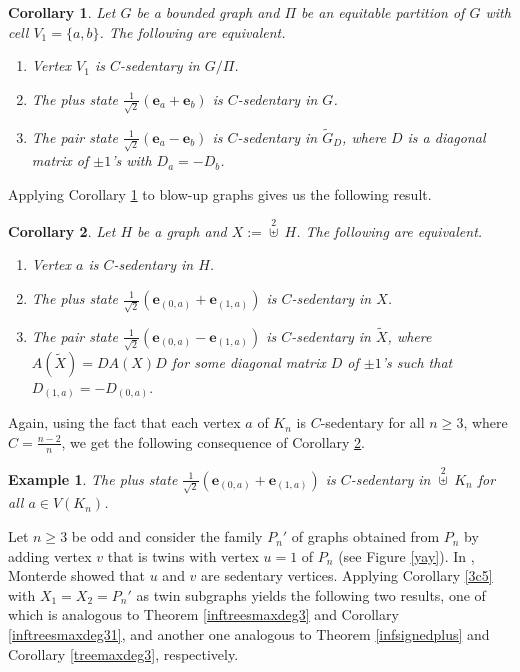 \documentclass[12pt,a4paper]{article}
\newtheorem{cor}{Corollary}
\newtheorem{exa}{Example}
\def \e {{\bf e}}
\def \e {{\mathbf e}}
\begin{document}
\begin{cor}
\label{plusPi2}
Let $G$ be a bounded graph and $\Pi$ be an equitable partition of $G$ with cell $V_1=\{a,b\}$. 
The following are equivalent.
\begin{enumerate}
\item Vertex $V_1$ is $C$-sedentary in $G/\Pi$.
\item The plus state $\frac{1}{\sqrt2}(\e_a+\e_{b})$ is $C$-sedentary in $G$.
\item The pair state $\frac{1}{\sqrt2}(\e_a-\e_{b})$ is $C$-sedentary in $\tilde{G}_D$, where $D$ is a diagonal matrix of $\pm 1$'s with $D_{a}=-D_{b}$.
\end{enumerate}
\end{cor}

Applying Corollary \ref{plusPi2} to blow-up graphs gives us the following result.

\begin{cor}
\label{sedbu}
Let $H$ be a graph and $X:=\overset{2}{\uplus}~H$. The following are equivalent.
\begin{enumerate}
\item Vertex $a$ is $C$-sedentary in $H$.
\item The plus state $\frac{1}{\sqrt2}(\e_{(0,a)}+\e_{(1,a)})$ is $C$-sedentary in $X$.
\item The pair state $\frac{1}{\sqrt2}(\e_{(0,a)}-\e_{(1,a)})$ is $C$-sedentary in $\tilde{X}$, where $A(\tilde{X})=DA(X)D$ for some diagonal matrix $D$ of $\pm 1$'s such that $D_{(1,a)}=-D_{(0,a)}.$
\end{enumerate}
\end{cor}

Again, using the fact that each vertex $a$ of $K_n$ is $C$-sedentary for all $n\geq 3$, where $C=\frac{n-2}{n}$, we get the following consequence of Corollary \ref{sedbu}.

\begin{exa}
The plus state $\frac{1}{\sqrt2}(\e_{(0,a)}+\e_{(1,a)})$ is $C$-sedentary in $\overset{2}{\uplus}~K_n$ for all $a\in V(K_n)$.
\end{exa}

Let $n\geq 3$ be odd and consider the family $P_n'$ of graphs obtained from $P_n$ by adding vertex $v$ that is twins with vertex $u=1$ of $P_n$ (see Figure \ref{yay}). In \cite{monterde2023new}, Monterde showed that $u$ and $v$ are sedentary vertices. %
Applying Corollary \ref{3c5} with $X_1=X_2=P_n'$ as twin subgraphs yields the following two results, one of which is analogous to Theorem \ref{inftreesmaxdeg3} and Corollary \ref{inftreesmaxdeg31}, and another one analogous to Theorem \ref{infsignedplus} and Corollary \ref{treemaxdeg3}, respectively.
\end{document}
